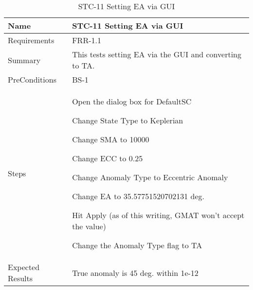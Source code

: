 


\begin{table}[htbp!]
\centering
      \begin{tabular}{|p{1.05 in} |p{4.75 in} |}
      \hline
         \rowcolor[rgb]{0.8,0.8,0.8} Name & STC-11 Setting EA via GUI \\    \hline
         Requirements & FRR-1.1 \\  \hline
         Summary &
         This tests setting EA via the GUI and converting to TA.
         \\  \hline
         PreConditions & BS-1\\
         \hline
         Steps &
         \begin{compactenum}
             \item Open the dialog box for DefaultSC
             \item Change State Type to Keplerian
             \item Change SMA to 10000
             \item Change ECC to 0.25
             \item Change Anomaly Type to Eccentric Anomaly
             \item Change EA to 35.57751520702131 deg.
             \item Hit Apply (as of this writing, GMAT won't accept the value)
             \item Change the Anomaly Type flag to TA
         \end{compactenum}
         \\ \hline
         Expected Results & True anomaly is 45 deg. within 1e-12 \\ \hline
\end{tabular}
      \label{Table: STC-11}
      \caption{STC-11 Setting EA via GUI}
\end{table} 